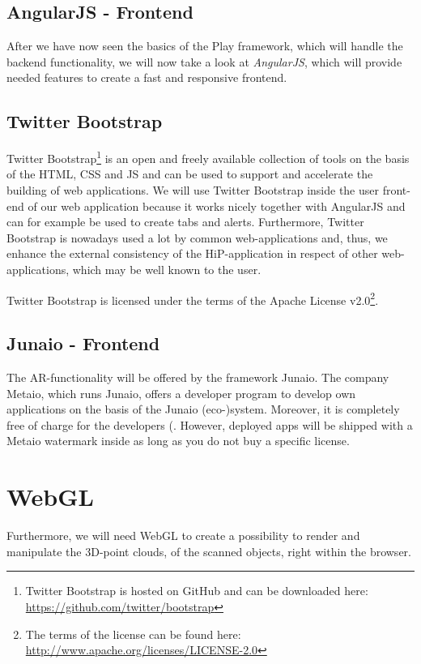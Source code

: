 \subsection{AngularJS - Frontend}
After we have now seen the basics of the Play framework, which will handle the backend functionality, we will now take a look at \textit{AngularJS}, which will provide needed features to create a fast and responsive frontend.



\subsection{Twitter Bootstrap}
Twitter Bootstrap\footnote{Twitter Bootstrap is hosted on GitHub and can be downloaded here: \url{https://github.com/twitter/bootstrap}} is an open and freely available collection of tools on the basis of the \ac{HTML}, \ac{CSS} and \ac{JS} and can be used to support and accelerate the building of web applications. We will use Twitter Bootstrap inside the user front-end of our web application because it works nicely together with AngularJS and can for example be used to create tabs and alerts. Furthermore, Twitter Bootstrap is nowadays used a lot by common web-applications and, thus, we enhance the external consistency  of the \ac{HiP}-application in respect of other web-applications, which may be well known to the user. 

Twitter Bootstrap is licensed under the terms of the Apache License v2.0\footnote{The terms of the license can be found here: \url{http://www.apache.org/licenses/LICENSE-2.0}}.

\subsection{Junaio - Frontend}
The \ac{AR}-functionality will be offered by the framework Junaio. The company Metaio, which runs Junaio, offers a developer program to develop own applications on the basis of the Junaio (eco-)system. Moreover, it is completely free of charge for the developers (\cite{junaio1}. However, deployed apps will be shipped with a Metaio watermark inside as long as you do not buy a specific license. 

\section{WebGL}
Furthermore, we will need WebGL to create a possibility to render and manipulate the 3D-point clouds, of the scanned objects, right within the browser.

